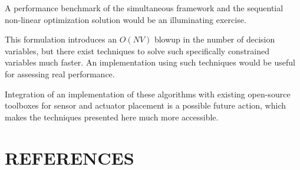 \documentclass[authoryear,preprint,review,12pt]{elsarticle}
\begin{document}
A performance benchmark of the simultaneous framework and the sequential
non-linear optimization solution would be an illuminating exercise.

This formulation introduces an $O(NV)$ blowup in the number of decision
variables, but there exist techniques to solve such specifically constrained
variables much faster. An implementation using such techniques would
be useful for assessing real performance.

Integration of an implementation of these algorithms with existing
open-source toolboxes for sensor and actuator placement is a possible
future action, which makes the techniques presented here much more
accessible.

\section{REFERENCES}



\batchmode
\end{document}
